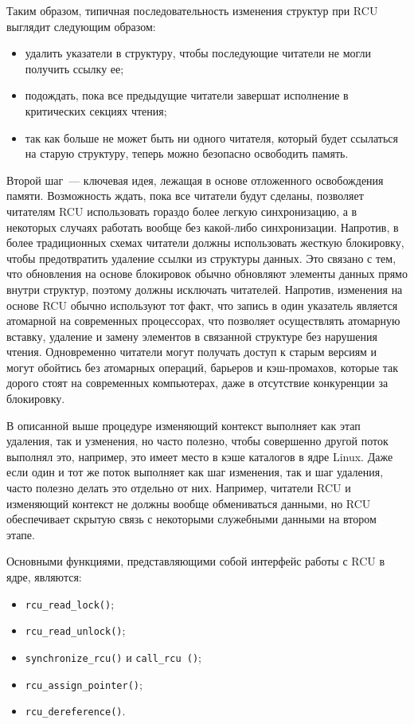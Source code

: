 Таким образом, типичная последовательность изменения структур при RCU выглядит
следующим образом:
\begin{itemize}
\item удалить указатели в структуру, чтобы последующие читатели не могли
  получить ссылку ее;
\item подождать, пока все предыдущие читатели завершат исполнение в критических
  секциях чтения;
\item так как больше не может быть ни одного читателя, который будет ссылаться
  на старую структуру, теперь можно безопасно освободить память.
\end{itemize}

Второй шаг~--- ключевая идея, лежащая в основе отложенного освобождения памяти.
Возможность ждать, пока все читатели будут сделаны, позволяет читателям RCU
использовать гораздо более легкую синхронизацию, а в некоторых случаях работать
вообще без какой-либо синхронизации. Напротив, в более традиционных схемах
читатели должны использовать жесткую блокировку, чтобы предотвратить удаление
ссылки из структуры данных. Это связано с тем, что обновления на основе
блокировок обычно обновляют элементы данных прямо внутри структур, поэтому
должны исключать читателей. Напротив, изменения на основе RCU обычно используют
тот факт, что запись в один указатель является атомарной на современных
процессорах, что позволяет осуществлять атомарную вставку, удаление и замену
элементов в связанной структуре без нарушения чтения. Одновременно читатели
могут получать доступ к старым версиям и могут обойтись без атомарных операций,
барьеров и кэш-промахов, которые так дорого стоят на современных компьютерах,
даже в отсутствие конкуренции за блокировку.

В описанной выше процедуре изменяющий контекст выполняет как этап
удаления, так и узменения, но часто полезно, чтобы совершенно другой поток
выполнял это, например, это имеет место в кэше каталогов в ядре Linux. Даже если
один и тот же поток выполняет как шаг изменения, так и шаг удаления, часто
полезно делать это отдельно от них. Например, читатели RCU и изменяющий контекст
не должны вообще обмениваться данными, но RCU обеспечивает скрытую связь с
некоторыми служебными данными на втором этапе.

Основными функциями, представляющими собой интерфейс работы с RCU в ядре,
являются:
\begin{itemize}
\item \texttt{rcu\_read\_lock()};
\item \texttt{rcu\_read\_unlock()};
\item \texttt{synchronize\_rcu()} и \texttt{call\_rcu ()};
\item \texttt{rcu\_assign\_pointer()};
\item \texttt{rcu\_dereference()}.
\end{itemize}

